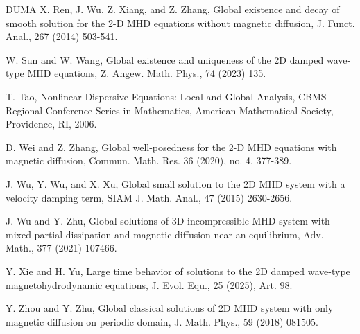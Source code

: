 \documentclass[reqno,11pt]{amsart}
\numberwithin{Thm}{section}
\begin{document}
\begin {thebibliography}{DUMA}
 X. Ren, J. Wu, Z. Xiang, and Z. Zhang, Global existence and decay of
smooth solution for the 2-D MHD equations without magnetic diffusion, J. Funct. Anal.,
267 (2014) 503-541.

 W. Sun and W. Wang, Global existence and uniqueness of the 2D damped wave-type MHD equations, Z. Angew. Math. Phys., 74 (2023) 135.

 T. Tao, Nonlinear Dispersive Equations: Local and Global Analysis, CBMS Regional Conference Series in Mathematics, American Mathematical Society, Providence, RI, 2006.


  D. Wei and Z. Zhang, Global well-posedness for the 2-D MHD equations with magnetic diffusion, Commun. Math. Res. 36 (2020), no. 4, 377-389.

  J. Wu, Y. Wu, and X. Xu, Global small solution to the 2D MHD system with a velocity damping term, SIAM J. Math. Anal., 47 (2015) 2630-2656.

  J. Wu and Y. Zhu, Global solutions of 3D incompressible MHD system with mixed partial dissipation and magnetic diffusion near an equilibrium, Adv. Math., 377 (2021) 107466.

  Y. Xie and H. Yu, Large time behavior of solutions to the 2D damped wave-type magnetohydrodynamic equations, J. Evol. Equ., 25 (2025), Art. 98.

  Y. Zhou and Y. Zhu, Global classical solutions of 2D MHD system with only magnetic diffusion on periodic domain, J. Math. Phys., 59 (2018) 081505.
\end{thebibliography}
\end{document}
